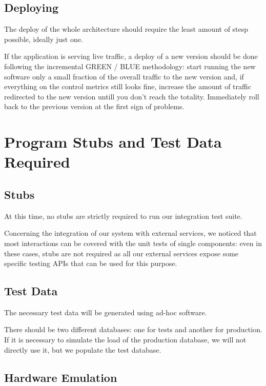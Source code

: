 \documentclass[11pt]{article} %
\begin{document}
\subsection{Deploying}

The deploy of the whole architecture should require the least amount of stesp possible, ideally just one.

If the application is serving live traffic, a deploy of a new version should be done following the incremental GREEN / BLUE methodology: start running the new software only a small fraction of the overall traffic to the new version and, if everything on the control metrics still looks fine, increase the amount of traffic redirected to the new version untill you don't reach the totality. Immediately roll back to the previous version at the first sign of problems.

\newpage
\section{Program Stubs and Test Data Required}

\subsection{Stubs}

At this time, no stubs are strictly required to run our integration test suite.

Concerning the integration of our system with external services, we noticed that most interactions can be covered with the unit tests of single components: even in these cases, stubs are not required as all our external services expose some specific testing APIs that can be used for this purpose.

\subsection{Test Data}

The necessary test data will be generated using ad-hoc software.

There should be two different databases: one for tests and another for production. If it is necessary to simulate the load of the production database, we will not directly use it, but we populate the test database.

\subsection{Hardware Emulation}
\end{document}
